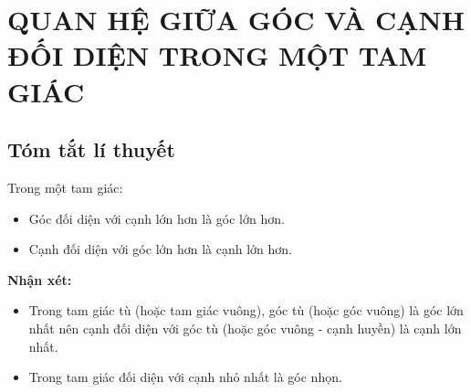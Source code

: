 \section{QUAN HỆ GIỮA GÓC VÀ CẠNH ĐỐI DIỆN TRONG MỘT TAM GIÁC}
\subsection{Tóm tắt lí thuyết }
\begin{dl}
Trong một tam giác:
\begin{itemize}
	\item Góc đối diện với cạnh lớn hơn là góc lớn hơn.
	\item Cạnh đối diện với góc lớn hơn là cạnh lớn hơn.
\end{itemize}
\end{dl}
\begin{note} \textbf{Nhận xét:}
\begin{itemize}
	\item Trong tam giác tù (hoặc tam giác vuông), góc tù (hoặc góc vuông) là góc lớn nhất nên cạnh đối diện với góc tù (hoặc góc vuông - cạnh huyền) là cạnh lớn nhất.
	\item Trong tam giác đối diện với cạnh nhỏ nhất là góc nhọn.
\end{itemize}
\end{note}
